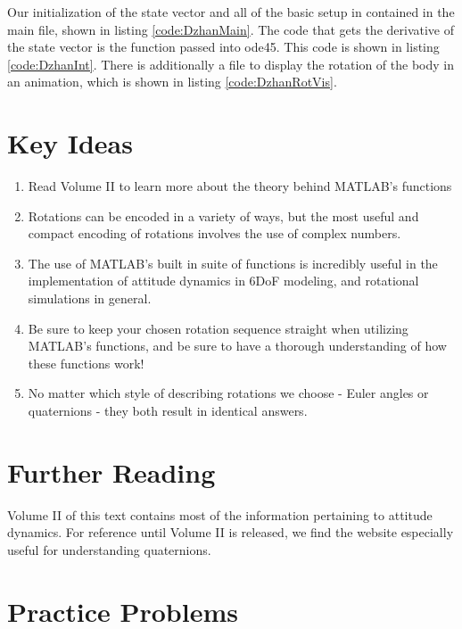 \documentclass[12pt]{report}
\begin{document}
Our initialization of the \gls{state vector} and all of the basic setup in contained in the main file, shown in listing \ref{code:DzhanMain}. The code that gets the derivative of the \gls{state vector} is the function passed into ode45. This code is shown in listing \ref{code:DzhanInt}. There is additionally a file to display the rotation of the body in an animation, which is shown in listing \ref{code:DzhanRotVis}.

\section{Key Ideas}
\begin{enumerate}
    \item Read Volume II to learn more about the theory behind MATLAB's functions
    \item Rotations can be encoded in a variety of ways, but the most useful and compact encoding of rotations involves the use of complex numbers.
    \item The use of MATLAB's built in suite of functions is incredibly useful in the implementation of attitude dynamics in 6DoF modeling, and rotational simulations in general.
    \item Be sure to keep your chosen rotation sequence straight when utilizing MATLAB's functions, and be sure to have a thorough understanding of how these functions work!
    \item No matter which style of describing rotations we choose - \gls{Euler angles} or \glspl{quaternion} - they both result in identical answers.
\end{enumerate}
\section{Further Reading}
Volume II of this text contains most of the information pertaining to attitude dynamics. For reference until Volume II is released, we find the website \cite{narayan_how_2017} especially useful for understanding quaternions.

\section{Practice Problems}
\end{document}
